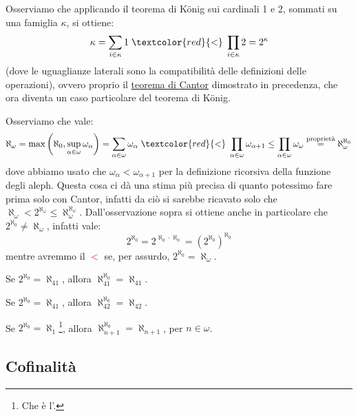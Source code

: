 \documentclass[11pt]{scrartcl}
\begin{document}
\begin{example}
	Osserviamo che applicando il teorema di König sui cardinali 1 e 2, sommati su una famiglia $\kappa$, si ottiene:
	\[ \kappa = \sum_{i \in \kappa} 1 \;\textcolor{red}{<}\; \prod_{i \in \kappa} 2 = 2^\kappa
		\]
	(dove le uguaglianze laterali sono la compatibilità delle definizioni delle operazioni), ovvero proprio il \hyperref[cantor]{teorema di Cantor} dimostrato in precedenza, che ora diventa un caso particolare del teorema di König.
\end{example}

\begin{example}
	Osserviamo che vale:
	\[ \aleph_\omega = \max\left(\aleph_0, \sup_{\alpha \in \omega} \omega_\alpha\right) = \sum_{\alpha \in \omega} \omega_\alpha \;\textcolor{red}{<}\; \prod_{\alpha \in \omega} \omega_{\alpha + 1} \leq \prod_{\alpha \in \omega} \omega_\omega \overset{\text{proprietà}}{=} \aleph_\omega^{\aleph_0}
		\]
	dove abbiamo usato che $\omega_\alpha < \omega_{\alpha + 1}$ per la definizione ricorsiva della funzione degli aleph. Questa cosa ci dà una stima più precisa di quanto potessimo fare prima solo con Cantor, infatti da ciò si sarebbe ricavato solo che $\aleph_\omega < 2^{\aleph_\omega} \leq \aleph_\omega^{\aleph_\omega}$. Dall'osservazione
	sopra si ottiene anche in particolare che $2^{\aleph_0} \ne \aleph_\omega$, infatti vale:
	\[ 2^{\aleph_0} = 2^{\aleph_0 \cdot \aleph_0} = (2^{\aleph_0})^{\aleph_0}
		\]
	mentre avremmo il \textcolor{red}{$<$} se, per assurdo, $2^{\aleph_0} = \aleph_\omega$.
\end{example}

\begin{exercise}[Facile]
	Se $2^{\aleph_0} = \aleph_{41}$, allora $\aleph_{41}^{\aleph_0} = \aleph_{41}$.
\end{exercise}

\begin{exercise}[Difficile]
	Se $2^{\aleph_0} = \aleph_{41}$, allora $\aleph_{42}^{\aleph_0} = \aleph_{42}$.
\end{exercise}

\begin{exercise}
	Se $2^{\aleph_0} = \aleph_{1}$\footnote{Che è l'.}, allora $\aleph_{n+1}^{\aleph_0} = \aleph_{n+1}$, per $n \in \omega$.
\end{exercise}

\subsection{Cofinalità}
\end{document}
